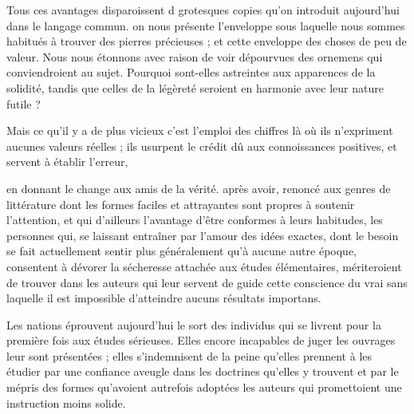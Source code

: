 \documentclass[11pt,a4paper]{article}
\begin{document}
Tous ces avantages disparoissent d grotesques copies
qu'on introduit aujourd'hui dans le langage commun. on nous présente
 l'enveloppe sous laquelle nous sommes habitués à
trouver des pierres précieuses ;  et cette enveloppe
 des choses de peu de valeur. Nous
nous étonnons avec raison de  voir dépourvues des ornemens
qui conviendroient au sujet. Pourquoi sont-elles astreintes aux
apparences de la solidité, tandis que celles de la légèreté seroient en
harmonie avec leur nature futile ? 

Mais ce qu'il y a de plus vicieux c'est l'emploi des chiffres là où ils
n'expriment aucunes valeurs réelles ; ils usurpent le crédit dû aux
connoissances positives, et servent à établir l'erreur,

 en donnant le change aux amis de la vérité.
 après avoir, renoncé aux genres de littérature
dont les formes faciles et attrayantes sont propres à soutenir
l'attention, et qui d'ailleurs \struck{\ill{}} 
 l'avantage d'être conformes à leurs habitudes, les
personnes qui, se  laissant entraîner par
l'amour des idées exactes, dont le besoin se fait actuellement sentir
plus généralement qu'à aucune autre époque, consentent à dévorer la
sécheresse attachée aux études élémentaires, mériteroient de trouver
dans les auteurs qui  leur servent de guide cette
conscience du vrai sans laquelle il est impossible d'atteindre aucuns
résultats importans.

Les nations éprouvent aujourd'hui le sort des individus qui se livrent
pour la première fois aux études sérieuses. Elles  encore
incapables de juger les ouvrages  
leur sont présentées ; elles s'indemnisent de la peine qu'elles prennent
à les étudier par une confiance aveugle dans les doctrines qu'elles y
trouvent et par le mépris des formes qu'avoient autrefois adoptées les
auteurs qui  promettoient une instruction moins solide.
\end{document}
